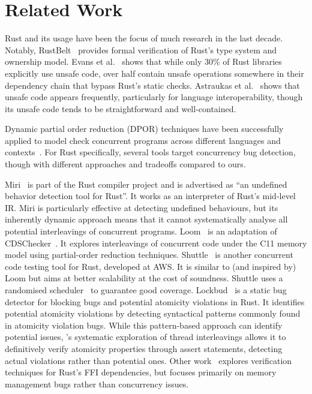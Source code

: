 \section{Related Work}
\label{sec:related-work}
Rust and its usage have been the focus of much research in
the last decade.
Notably, RustBelt~\cite{JKD18} provides formal verification of Rust's
type system and ownership model.
Evans et al.~\cite{EvansCS20} shows that while only 30\% of Rust
libraries explicitly use unsafe code, over half contain unsafe
operations somewhere in their dependency chain that bypass Rust's
static checks.
Astraukas et al.~\cite{AstrauskasMP0S20} shows that unsafe code
appears frequently, particularly for language interoperability, though
its unsafe code tends to be straightforward and well-contained.


Dynamic partial order reduction (DPOR) techniques have been
successfully applied to model check concurrent programs across
different languages and
contexts~\cite{AbdullaAJS14,FlanaganG05,AbdullaAAJLS15}. For Rust
specifically, several tools target concurrency bug detection, though
with different approaches and tradeoffs compared to ours.

Miri~\cite{miri} is part of the Rust compiler project and is
advertised as ``an undefined behavior detection tool for Rust''. It
works as an interpreter of Rust's mid-level IR.
Miri is particularly effective at detecting undefined behaviours, but
its inherently dynamic approach means that it cannot systematically
analyse all potential interleavings of concurrent programs.
Loom~\cite{loom} is an adaptation of CDSChecker~\cite{NorrisD16}. It
explores interleavings of concurrent code under
the C11 memory model using partial-order reduction techniques.
Shuttle~\cite{awshuttle} is another concurrent code testing tool for
Rust, developed at AWS. It is similar to (and inspired by) Loom but
aims at better scalability at the cost of soundness. Shuttle uses a
randomised scheduler~\cite{BurckhardtKMN10} to guarantee good
coverage.
Lockbud~\cite{Lockbud,QinCLZWSZ24} is a static bug detector for
blocking bugs and potential atomicity violations in Rust. It
identifies potential atomicity violations by detecting syntactical
patterns commonly found in atomicity violation bugs. While this
pattern-based approach can identify potential issues, \rustmc's
systematic exploration of thread interleavings allows it to
definitively verify atomicity properties through assert statements,
detecting actual violations rather than potential ones.
Other work~\cite{CRUST_TomanPT15,LiWSL22_FFI_checker} explores 
verification techniques for Rust's FFI dependencies, but 
focuses primarily on memory management bugs rather than concurrency
issues.

